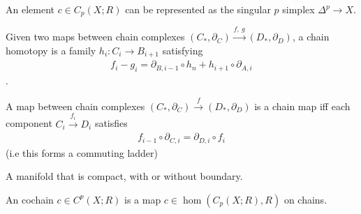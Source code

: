 \begin{definition}[Chain]

An element \(c \in C_{p}(X; R)\) can be represented as the singular
\(p\) simplex \(\Delta^p \to X\).

\end{definition}

\begin{definition}

Given two maps between chain complexes
\((C_*, {\partial}_{C}) \xrightarrow{f, ~g} (D_*, {\partial}_{D})\), a
chain homotopy is a family \(h_{i}: C_{i} \to B_{i+1}\) satisfying
\begin{align*}f_{i}-g_{i} = {\partial}_{B, i-1}\circ h_{n} + h_{i+1}\circ {\partial}_{A, i}\end{align*}
.

\end{definition}

\begin{definition}

A map between chain complexes
\((C_*, {\partial}_{C}) \xrightarrow{f} (D_*, {\partial}_{D})\) is a
chain map iff each component \(C_{i} \xrightarrow{f_{i}} D_{i}\)
satisfies
\begin{align*}
f_{i-1}\circ{\partial}_{C, i} = {\partial}_{D,i} \circ f_{i}
\end{align*}
(i.e this forms a commuting ladder)

\end{definition}

\begin{definition}

A manifold that is compact, with or without boundary.

\end{definition}

\begin{definition}[Coboundary]

\end{definition}


\begin{definition}[Cochain]

An cochain \(c \in C^p(X; R)\) is a map \(c \in \hom(C_{p}(X; R), R)\)
on chains.

\end{definition}

\begin{definition}[Cocycle]

\end{definition}

